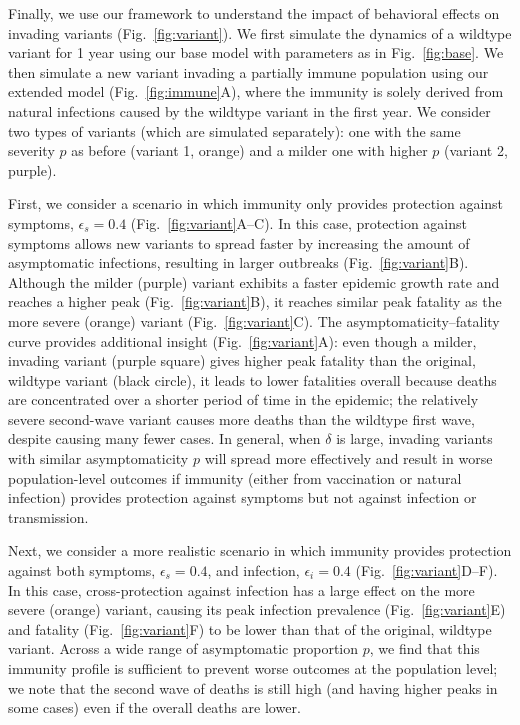 \documentclass[12pt]{article}
\newcommand{\fref}[1]{Fig.~\ref{fig:#1}}
\begin{document}
Finally, we use our framework to understand the impact of behavioral effects on invading variants (\fref{variant}).
We first simulate the dynamics of a wildtype variant for 1 year using our base model with parameters as in \fref{base}.
We then simulate a new variant invading a partially immune population using our extended model (\fref{immune}A), where the immunity is solely derived from natural infections caused by the wildtype variant in the first year.
We consider two types of variants (which are simulated separately): one with the same severity $p$ as before (variant 1, orange) and a milder one with higher $p$ (variant 2, purple).

First, we consider a scenario in which immunity only provides protection against symptoms, $\epsilon_s = 0.4$ (\fref{variant}A--C).
In this case, protection against symptoms allows new variants to spread faster by increasing the amount of asymptomatic infections, resulting in larger outbreaks (\fref{variant}B).
Although the milder (purple) variant exhibits a faster epidemic growth rate and reaches a higher peak (\fref{variant}B), it reaches similar peak fatality as the more severe (orange) variant (\fref{variant}C).
The asymptomaticity--fatality curve provides additional insight (\fref{variant}A): even though a milder, invading variant (purple square) gives higher peak fatality than the original, wildtype variant (black circle), it leads to lower fatalities overall because deaths are concentrated over a shorter period of time in the epidemic; the relatively severe second-wave variant causes more deaths than the wildtype first wave, despite causing many fewer cases.
In general, when $\delta$ is large, invading variants with similar asymptomaticity $p$ will spread more effectively and result in worse population-level outcomes if immunity (either from vaccination or natural infection) provides protection against symptoms but not against infection or transmission.

Next, we consider a more realistic scenario in which immunity provides protection against both symptoms, $\epsilon_s = 0.4$, and infection, $\epsilon_i = 0.4$ (\fref{variant}D--F).
In this case, cross-protection against infection has a large effect on the more severe (orange) variant, causing its peak infection prevalence (\fref{variant}E) and fatality (\fref{variant}F) to be lower than that of the original, wildtype variant.
Across a wide range of asymptomatic proportion $p$, we find that this immunity profile is sufficient to prevent worse outcomes at the population level;
we note that the second wave of deaths is still high (and having higher peaks in some cases) even if the overall deaths are lower.
\end{document}
